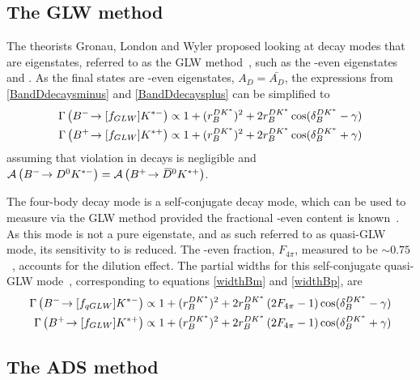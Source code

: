 \subsection{The GLW method}
\label{sec:theory:glw}

The theorists Gronau, London and Wyler proposed looking at \D decay modes that are \CP eigenstates, referred to as the GLW method~\cite{GL,GW}, such as the \CP-even eigenstates \decay{\D}{\Kp\Km} and \decay{\D}{\pip\pim}. As the final states are \CP-even eigenstates, $A_{D} = \bar{A_{D}}$, the expressions from \eqn\ref{BandDdecaysminus} and \ref{BandDdecaysplus} can be simplified to
\begin{align}
\Gamma\left({{{B}^-}}\!\rightarrow [f_{GLW}]{\ensuremath{{K}^{*-}}}\right) &\propto 1 + (r_B^{DK^*})^2 + 2r_B^{DK^*}\cos(\delta_B^{DK^*} - \gamma) \label{widthBm} \\
\Gamma\left({{{B}^+}}\!\rightarrow [f_{GLW}]{\ensuremath{{K}^{*+}}}\right) &\propto 1 + (r_B^{DK^*})^2 + 2r_B^{DK^*}\cos(\delta_B^{DK^*} + \gamma) \label{widthBp}
\end{align}
assuming that \CP violation in \D decays is negligible and $\mathcal{A}\left({{{B}^-}}\!\rightarrow {\ensuremath{{D}^0}}{\ensuremath{{K}^{*-}}}\right) = \mathcal{A}\left({{{B}^+}}\!\rightarrow {\ensuremath{{\kern 0.2em\overline{\kern -0.2em D}{}}{}^0}}{\ensuremath{{K}^{*+}}}\right)$. 

The four-body \D decay mode \decay{\D}{\pip\pim\pip\pim} is a self-conjugate decay mode, which can be used to measure \Pgamma via the GLW method provided the fractional \CP-even content is known~\cite{NAYAK20151}. As this mode is not a pure \CP eigenstate, and as such referred to as quasi-GLW mode, its sensitivity to \Pgamma is reduced. The \CP-even fraction, $F_{4\pi}$, measured to be $\sim 0.75$~\cite{charm4pi}, accounts for the dilution effect. The partial widths for this self-conjugate quasi-GLW mode~\cite{NAYAK20151,charm4pi}, corresponding to equations \ref{widthBm} and \ref{widthBp}, are
\begin{align}
\Gamma\left({{{B}^-}}\!\rightarrow [f_{qGLW}]{\ensuremath{{K}^{*-}}}\right) \propto 1 + (r_B^{DK^*})^2 + 2r_B^{DK^*}\left(2F_{4\pi} - 1\right)\cos(\delta_B^{DK^*} - \gamma) \label{widthBm4body} \\
\Gamma\left({{{B}^+}}\!\rightarrow [f_{GLW}]{\ensuremath{{K}^{*+}}}\right) \propto 1 + (r_B^{DK^*})^2 + 2r_B^{DK^*}\left(2F_{4\pi} - 1\right)\cos(\delta_B^{DK^*} + \gamma) \label{widthBp4body}
\end{align}


\subsection{The ADS method}
\label{sec:theory:ads}

